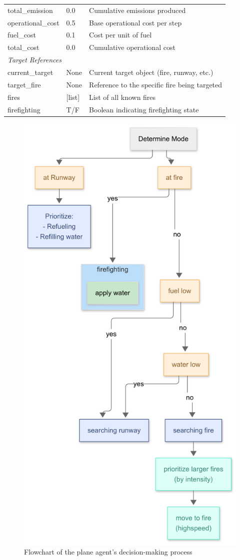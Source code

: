 \documentclass[11pt, a4paper]{article}
\begin{document}
\begin{table}[H]
\begin{tabular}{@{}p{2.5cm}p{1.5cm}p{6.5cm}@{}}
total\_emission & 0.0 & Cumulative emissions produced \\
operational\_cost & 0.5 & Base operational cost per step \\
fuel\_cost & 0.1 & Cost per unit of fuel \\
total\_cost & 0.0 & Cumulative operational cost \\
\midrule
\multicolumn{3}{l}{\textit{Target References}} \\
current\_target & None & Current target object (fire, runway, etc.) \\
target\_fire & None & Reference to the specific fire being targeted \\
fires & [list] & List of all known fires \\
firefighting & T/F & Boolean indicating firefighting state \\
\bottomrule
\end{tabular}
\end{table}



\begin{figure}[htbp]
    \centering
    \includegraphics[width=0.8\linewidth]{figures/plane_logic.png}
    \caption{Flowchart of the plane agent’s decision-making process}
    \label{fig:planeLogic}
\end{figure}
\newpage
\end{document}
